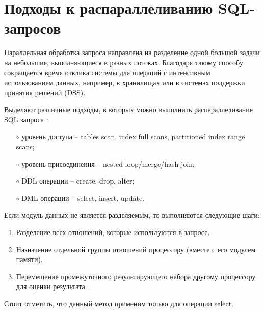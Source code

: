 \section{Подходы к распараллеливанию SQL-запросов}
\vspace{-0.5cm}
Параллельная обработка запроса направлена на разделение одной большой задачи на небольшие, выполняющиеся в разных потоках. Благодаря такому способу сокращается время отклика системы для операций с интенсивным использованием данных, например, в хранилищах или в системах поддержки принятия решений (DSS).

Выделяют различные подходы, в которых можно выполнить распараллеливание SQL запроса \cite{parallel_query}:
\begin{itemize}
	\item[$\circ$] уровень доступа -- tables scan, index full scans,  partitioned index range scans;
	\vspace{-0.2cm}
	\item[$\circ$] уровень присоединения -- nested loop/merge/hash join; \vspace{-0.2cm}
	\item[$\circ$] DDL операции -- create, drop, alter; \vspace{-0.2cm}
	\item[$\circ$] DML операции -- select, insert, update. \vspace{-0.2cm}
\end{itemize}
Если модуль данных не является разделяемым, то выполняются следующие шаги:
\begin{enumerate}
	\item Разделение всех отношений, которые используются в запросе. \vspace{-0.2cm}
	\item Назначение отдельной группы отношений процессору (вместе с его модулем памяти). \vspace{-0.2cm}
	\item Перемещение промежуточного результирующего набора другому процессору для оценки результата. \vspace{-0.2cm}
\end{enumerate}
Стоит отметить, что данный метод применим только для операции select.

\vspace{-0.5cm}
